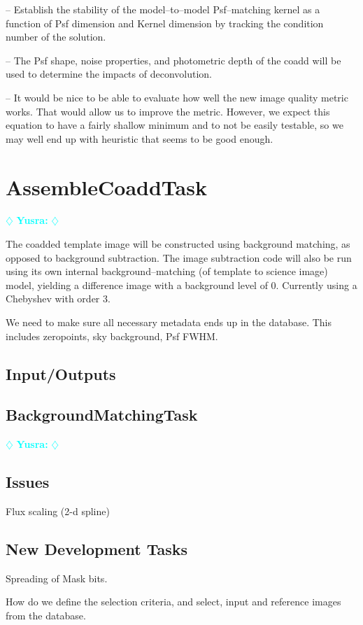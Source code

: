 \documentclass[12pt]{article}
\newcommand{\yusra} { \textcolor{cyan} {
\ensuremath{\diamondsuit} {\bf Yusra:}  
\ensuremath{\diamondsuit} } }
\begin{document}
-- Establish the stability of the model--to--model Psf--matching
kernel as a function of Psf dimension and Kernel dimension by tracking
the condition number of the solution.

-- The Psf shape, noise properties, and photometric depth of the coadd
will be used to determine the impacts of deconvolution.

-- It would be nice to be able to evaluate how well the new image quality metric
works. That would allow us to improve the metric. However, we expect this equation
to have a fairly shallow minimum and to not be easily testable, so we may well end up
with heuristic that seems to be good enough.


\clearpage 
\section{AssembleCoaddTask} \yusra

The coadded template image will be constructed using background
matching, as opposed to background subtraction.  The image subtraction
code will also be run using its own internal background--matching (of
template to science image) model, yielding a difference image with a
background level of 0.  Currently using a Chebyshev with order 3.

We need to make sure all necessary metadata ends up in the database.
This includes zeropoints, sky background, Psf FWHM.

\subsection{Input/Outputs}

\subsection{BackgroundMatchingTask} \yusra

\subsection{Issues}

Flux scaling (2-d spline)

\subsection{New Development Tasks}
Spreading of Mask bits.  

How do we define the selection criteria, and select, input and
reference images from the database.
\end{document}
